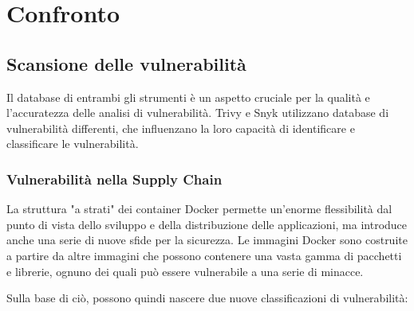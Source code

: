 \chapter{Confronto}
\section{Scansione delle vulnerabilità}
Il database di entrambi gli strumenti è un aspetto cruciale per la qualità e l'accuratezza delle analisi di vulnerabilità. Trivy e Snyk utilizzano database di vulnerabilità differenti, che influenzano la loro capacità di identificare e classificare le vulnerabilità.
\subsection{Vulnerabilità nella Supply Chain}
La struttura "a strati" dei container Docker permette un'enorme flessibilità dal punto di vista dello sviluppo e della distribuzione delle applicazioni, ma introduce anche una serie di nuove sfide per la sicurezza. Le immagini Docker sono costruite a partire da altre immagini che possono contenere una vasta gamma di pacchetti e librerie, ognuno dei quali può essere vulnerabile a una serie di minacce.

Sulla base di ciò, possono quindi nascere due nuove classificazioni di vulnerabilità:

